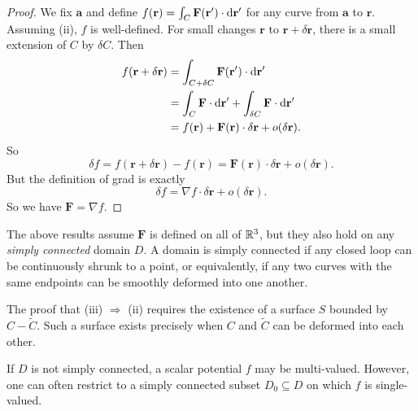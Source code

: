 \documentclass[a4paper]{article}
\begin{document}
\begin{proof}
  We fix $\mathbf{a}$ and define $f(\mathbf{r}) = \int_C \mathbf{F}(\mathbf{r}')\cdot\mathrm{d} \mathbf{r}'$ for any curve from $\mathbf{a}$ to $\mathbf{r}$. Assuming (ii), $f$ is well-defined. For small changes $\mathbf{r}$ to $\mathbf{r} + \delta \mathbf{r}$, there is a small extension of $C$ by $\delta C$. Then
  \begin{align*}
    f(\mathbf{r} + \delta \mathbf{r}) &= \int_{C + \delta C}\mathbf{F} (\mathbf{r}')\cdot \mathrm{d} \mathbf{r}'\\
    &= \int_C \mathbf{F}\cdot \mathrm{d} \mathbf{r}' + \int_{\delta C}\mathbf{F}\cdot \mathrm{d} \mathbf{r}'\\
    &= f(\mathbf{r}) + \mathbf{F}(\mathbf{r})\cdot \delta \mathbf{r} + o(\delta \mathbf{r}).
  \end{align*}
  So
  \[
    \delta f = f(\mathbf{r} + \delta \mathbf{r}) - f(\mathbf{r}) = \mathbf{F}(\mathbf{r})\cdot \delta \mathbf{r} + o(\delta \mathbf{r}).
  \]
  But the definition of grad is exactly
  \[
    \delta f = \nabla f\cdot \delta \mathbf{r} + o(\delta \mathbf{r}).
  \]
  So we have $\mathbf{F} = \nabla f$.
\end{proof}

\begin{rmk}
  The above results assume $\mathbf{F}$ is defined on all of $\mathbb{R}^3$, but they also hold on any \emph{simply connected} domain $D$. A domain is simply connected if any closed loop can be continuously shrunk to a point, or equivalently, if any two curves with the same endpoints can be smoothly deformed into one another.

  The proof that (iii) $\Rightarrow$ (ii) requires the existence of a surface $S$ bounded by $C - \tilde{C}$. Such a surface exists precisely when $C$ and $\tilde{C}$ can be deformed into each other.

  If $D$ is not simply connected, a scalar potential $f$ may be multi-valued. However, one can often restrict to a simply connected subset $D_0 \subseteq D$ on which $f$ is single-valued.
\end{rmk}
\end{document}
